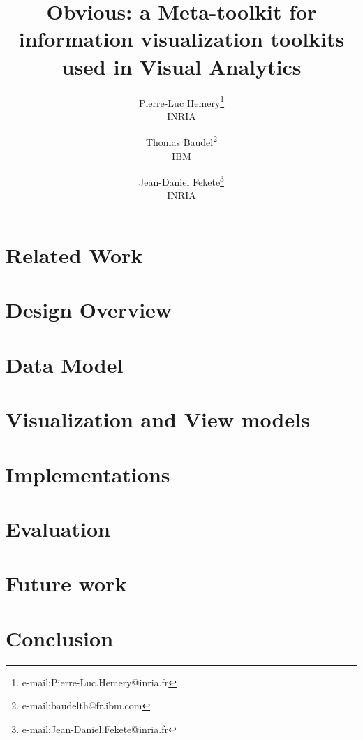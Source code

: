 \documentclass[electronic]{vgtc}             %
\title{Obvious: a Meta-toolkit for information visualization toolkits used in Visual Analytics}
\author{%
Pierre-Luc Hemery\thanks{e-mail:Pierre-Luc.Hemery@inria.fr}\\ %
  \scriptsize INRIA %
\and Thomas Baudel\thanks{e-mail:baudelth@fr.ibm.com}\\ %
  \scriptsize IBM %
\and Jean-Daniel Fekete\thanks{e-mail:Jean-Daniel.Fekete@inria.fr}\\ %
  \scriptsize INRIA %
}
\begin{document}

\maketitle



\section{Related Work}



\section{Design Overview}



\section{Data Model}



\section{Visualization and View models}



\section{Implementations}




\section{Evaluation}



\section{Future work}



\section{Conclusion}






\end{document}
